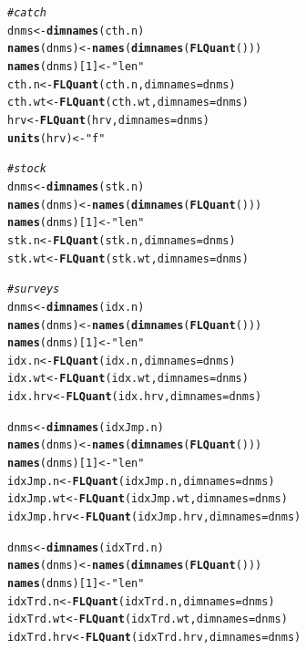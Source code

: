 \documentclass[a4paper,english,10pt]{article}\usepackage[]{graphicx}\usepackage[]{color}
\makeatletter
\newcommand{\hlnum}[1]{\textcolor[rgb]{0.686,0.059,0.569}{#1}}%
\newcommand{\hlstr}[1]{\textcolor[rgb]{0.192,0.494,0.8}{#1}}%
\newcommand{\hlcom}[1]{\textcolor[rgb]{0.678,0.584,0.686}{\textit{#1}}}%
\newcommand{\hlstd}[1]{\textcolor[rgb]{0.345,0.345,0.345}{#1}}%
\newcommand{\hlkwb}[1]{\textcolor[rgb]{0.69,0.353,0.396}{#1}}%
\newcommand{\hlkwc}[1]{\textcolor[rgb]{0.333,0.667,0.333}{#1}}%
\newcommand{\hlkwd}[1]{\textcolor[rgb]{0.737,0.353,0.396}{\textbf{#1}}}%
\newenvironment{kframe}{%
 \def\at@end@of@kframe{}%
 \ifinner\ifhmode%
  \def\at@end@of@kframe{\end{minipage}}%
  \begin{minipage}{\columnwidth}%
 \fi\fi%
 \def\FrameCommand##1{\hskip\@totalleftmargin \hskip-\fboxsep
 \colorbox{shadecolor}{##1}\hskip-\fboxsep
     \hskip-\linewidth \hskip-\@totalleftmargin \hskip\columnwidth}%
 \MakeFramed {\advance\hsize-\width
   \@totalleftmargin\z@ \linewidth\hsize
   \@setminipage}}%
 {\par\unskip\endMakeFramed%
 \at@end@of@kframe}
\newenvironment{knitrout}{}{} %
\makeatother
\begin{document}
\begin{knitrout}
\color{fgcolor}\begin{kframe}
\begin{alltt}
\hlcom{# catch}
\hlstd{dnms} \hlkwb{<-} \hlkwd{dimnames}\hlstd{(cth.n)}
\hlkwd{names}\hlstd{(dnms)} \hlkwb{<-} \hlkwd{names}\hlstd{(}\hlkwd{dimnames}\hlstd{(}\hlkwd{FLQuant}\hlstd{()))}
\hlkwd{names}\hlstd{(dnms)[}\hlnum{1}\hlstd{]} \hlkwb{<-} \hlstr{"len"}
\hlstd{cth.n} \hlkwb{<-} \hlkwd{FLQuant}\hlstd{(cth.n,} \hlkwc{dimnames} \hlstd{= dnms)}
\hlstd{cth.wt} \hlkwb{<-} \hlkwd{FLQuant}\hlstd{(cth.wt,} \hlkwc{dimnames} \hlstd{= dnms)}
\hlstd{hrv} \hlkwb{<-} \hlkwd{FLQuant}\hlstd{(hrv,} \hlkwc{dimnames} \hlstd{= dnms)}
\hlkwd{units}\hlstd{(hrv)} \hlkwb{<-} \hlstr{"f"}

\hlcom{# stock}
\hlstd{dnms} \hlkwb{<-} \hlkwd{dimnames}\hlstd{(stk.n)}
\hlkwd{names}\hlstd{(dnms)} \hlkwb{<-} \hlkwd{names}\hlstd{(}\hlkwd{dimnames}\hlstd{(}\hlkwd{FLQuant}\hlstd{()))}
\hlkwd{names}\hlstd{(dnms)[}\hlnum{1}\hlstd{]} \hlkwb{<-} \hlstr{"len"}
\hlstd{stk.n} \hlkwb{<-} \hlkwd{FLQuant}\hlstd{(stk.n,} \hlkwc{dimnames} \hlstd{= dnms)}
\hlstd{stk.wt} \hlkwb{<-} \hlkwd{FLQuant}\hlstd{(stk.wt,} \hlkwc{dimnames} \hlstd{= dnms)}

\hlcom{# surveys}
\hlstd{dnms} \hlkwb{<-} \hlkwd{dimnames}\hlstd{(idx.n)}
\hlkwd{names}\hlstd{(dnms)} \hlkwb{<-} \hlkwd{names}\hlstd{(}\hlkwd{dimnames}\hlstd{(}\hlkwd{FLQuant}\hlstd{()))}
\hlkwd{names}\hlstd{(dnms)[}\hlnum{1}\hlstd{]} \hlkwb{<-} \hlstr{"len"}
\hlstd{idx.n} \hlkwb{<-} \hlkwd{FLQuant}\hlstd{(idx.n,} \hlkwc{dimnames} \hlstd{= dnms)}
\hlstd{idx.wt} \hlkwb{<-} \hlkwd{FLQuant}\hlstd{(idx.wt,} \hlkwc{dimnames} \hlstd{= dnms)}
\hlstd{idx.hrv} \hlkwb{<-} \hlkwd{FLQuant}\hlstd{(idx.hrv,} \hlkwc{dimnames} \hlstd{= dnms)}

\hlstd{dnms} \hlkwb{<-} \hlkwd{dimnames}\hlstd{(idxJmp.n)}
\hlkwd{names}\hlstd{(dnms)} \hlkwb{<-} \hlkwd{names}\hlstd{(}\hlkwd{dimnames}\hlstd{(}\hlkwd{FLQuant}\hlstd{()))}
\hlkwd{names}\hlstd{(dnms)[}\hlnum{1}\hlstd{]} \hlkwb{<-} \hlstr{"len"}
\hlstd{idxJmp.n} \hlkwb{<-} \hlkwd{FLQuant}\hlstd{(idxJmp.n,} \hlkwc{dimnames} \hlstd{= dnms)}
\hlstd{idxJmp.wt} \hlkwb{<-} \hlkwd{FLQuant}\hlstd{(idxJmp.wt,} \hlkwc{dimnames} \hlstd{= dnms)}
\hlstd{idxJmp.hrv} \hlkwb{<-} \hlkwd{FLQuant}\hlstd{(idxJmp.hrv,} \hlkwc{dimnames} \hlstd{= dnms)}

\hlstd{dnms} \hlkwb{<-} \hlkwd{dimnames}\hlstd{(idxTrd.n)}
\hlkwd{names}\hlstd{(dnms)} \hlkwb{<-} \hlkwd{names}\hlstd{(}\hlkwd{dimnames}\hlstd{(}\hlkwd{FLQuant}\hlstd{()))}
\hlkwd{names}\hlstd{(dnms)[}\hlnum{1}\hlstd{]} \hlkwb{<-} \hlstr{"len"}
\hlstd{idxTrd.n} \hlkwb{<-} \hlkwd{FLQuant}\hlstd{(idxTrd.n,} \hlkwc{dimnames} \hlstd{= dnms)}
\hlstd{idxTrd.wt} \hlkwb{<-} \hlkwd{FLQuant}\hlstd{(idxTrd.wt,} \hlkwc{dimnames} \hlstd{= dnms)}
\hlstd{idxTrd.hrv} \hlkwb{<-} \hlkwd{FLQuant}\hlstd{(idxTrd.hrv,} \hlkwc{dimnames} \hlstd{= dnms)}
\end{alltt}
\end{kframe}
\end{knitrout}
\end{document}
